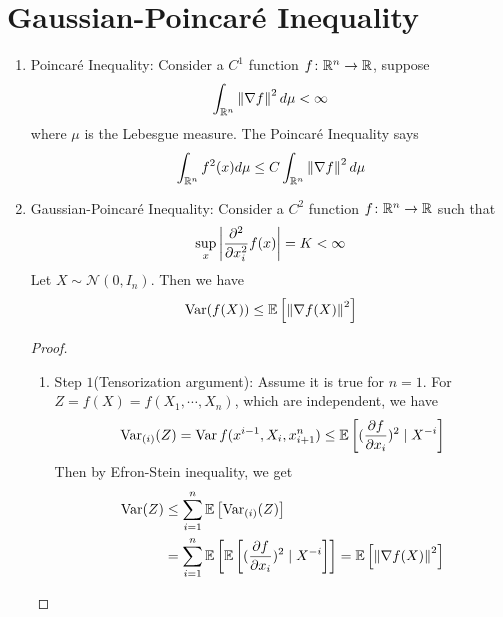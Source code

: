 \section{Gaussian-Poincar\'e Inequality}
\begin{enumerate}[label=\arabic{*}.]
	\item Poincar\'e Inequality: Consider a $C^1$ function $f \colon \mathbb{R}^n \rightarrow \mathbb{R}$, suppose
	\begin{equation*}
	    \int_{\mathbb{R}^n} \left\lVert\nabla f\right\lVert^2 d\mu < \infty
	\end{equation*}
	where $\mu$ is the Lebesgue measure. The Poincar\'e Inequality says
	\begin{equation*}
	    \int_{\mathbb{R}^n} f^2(x) d\mu \leq C\int_{\mathbb{R}^n} \left\lVert\nabla f\right\lVert^2 d\mu
	\end{equation*}

	\item Gaussian-Poincar\'e Inequality: Consider a $C^2$ function $f \colon \mathbb{R}^n \rightarrow \mathbb{R}$ such that
	\begin{equation*}
	    \sup_x \left\lvert\frac{\partial^2}{\partial x_i^2}f(x)\right\lvert = K < \infty
	\end{equation*}
	Let $X \sim \mathcal{N}(0,I_n)$. Then we have
	\begin{equation*}
	    \operatorname{Var}(f(X)) \leq \mathbb{E} \left[\left\lVert\nabla f(X)\right\lVert^2\right]
	\end{equation*}
	\begin{proof}
	    \begin{enumerate}[label=\Roman{*}.]
	    	\item Step $1$(Tensorization argument): Assume it is true for $n=1$. For $Z = f(X) = f(X_1,\cdots,X_n)$, which are independent, we have
	    	\begin{equation*}
	    	    \operatorname{Var}_{(i)}(Z) =\operatorname{Var}{f(x^{i-1},X_i,x_{i+1}^n)} \leq \mathbb{E}\left[(\frac{\partial f}{\partial x_i})^2 \mid X^{-i}\right]
	    	\end{equation*}
	    	Then by Efron-Stein inequality, we get
	    	\begin{equation*}
	    	    \begin{aligned}
	    	    	\operatorname{Var}(Z) &\leq \sum_{i=1}^n\mathbb{E}\left[\operatorname{Var}_{(i)}(Z)\right] \\
	    	    	&= \sum_{i=1}^n \mathbb{E}\left[\mathbb{E}\left[(\frac{\partial f}{\partial x_i})^2 \mid X^{-i}\right]\right] = \mathbb{E} \left[\left\lVert\nabla f(X)\right\lVert^2\right]
	    	    \end{aligned}
	    	\end{equation*}


\end{enumerate}
\end{proof}
\end{enumerate}

